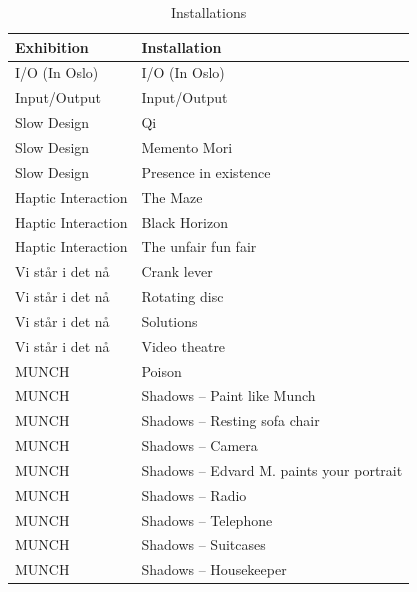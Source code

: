\begin{table}[H]
\centering
\begin{tabular}{l | l}
\textbf{Exhibition} & \textbf{Installation}\\
\hline
I/O (In Oslo) & I/O (In Oslo)\\
Input/Output & Input/Output  \\
Slow Design & Qi \\
Slow Design & Memento Mori \\
Slow Design & Presence in existence \\
Haptic Interaction & The Maze \\
Haptic Interaction & Black Horizon \\
Haptic Interaction & The unfair fun fair \\
Vi står i det nå & Crank lever \\
Vi står i det nå & Rotating disc \\
Vi står i det nå & Solutions \\
Vi står i det nå & Video theatre \\
MUNCH & Poison  \\
MUNCH & Shadows -- Paint like Munch \\
MUNCH & Shadows -- Resting sofa chair  \\
MUNCH & Shadows -- Camera \\
MUNCH & Shadows -- Edvard M. paints your portrait  \\
MUNCH & Shadows -- Radio \\
MUNCH & Shadows -- Telephone  \\
MUNCH & Shadows -- Suitcases  \\
MUNCH & Shadows -- Housekeeper  \\
\end{tabular}
\caption{Installations}
\label{tab:abc}
\end{table}

